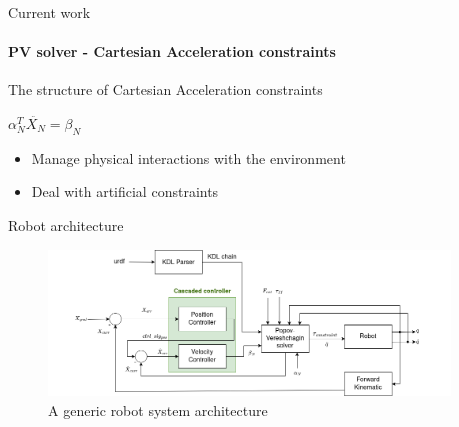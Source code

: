 \documentclass[aspectratio=169]{beamer}
\begin{document}
\begin{frame}{Current work}
  \framesubtitle{PV solver - Cartesian Acceleration constraints}
  \vspace{-15mm}
  \begin{block}{The structure of Cartesian Acceleration constraints}
    
    $\alpha_N^T \ddot{X_N} = \beta_N$
  \end{block}
\begin{itemize}
  \item Manage physical interactions with the environment
  \item Deal with artificial constraints
\end{itemize}
\vspace{-3mm}
\begin{figure}
  \hspace{2mm}
\end{figure}
\vspace{-30mm}
\end{frame}

\begin{frame}{Robot architecture}
\centering
\begin{figure}
  \includegraphics[width=0.95\textwidth]{images/system_arch.png}
  \caption{A generic robot system architecture}
\end{figure}
\end{frame}
\end{document}
